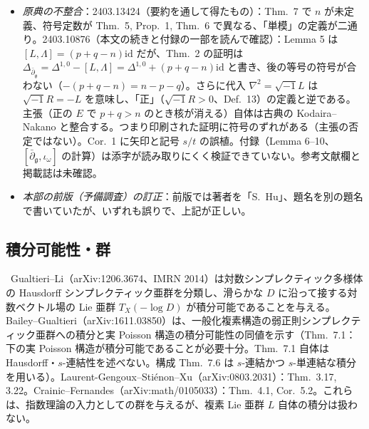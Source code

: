 \begin{itemize}
\item \emph{原典の不整合}：2403.13424（要約を通して得たもの）：Thm.\ 7 で $n$ が未定義、符号定数が Thm.\ 5, Prop.\ 1, Thm.\ 6 で異なる、「単模」の定義が二通り。2403.10876（本文の続きと付録の一部を読んで確認\tC）：Lemma 5 は $[L,\Lambda]=(p+q-n)\mathrm{id}$ だが、Thm.\ 2 の証明は $\Delta_{\bar\partial_{\mathfrak g}}=\Delta^{1,0}-[L,\Lambda]=\Delta^{1,0}+(p+q-n)\mathrm{id}$ と書き、後の等号の符号が合わない（$-(p+q-n)=n-p-q$）。さらに代入 $\nabla^2=\sqrt{-1}L$ は $\sqrt{-1}R=-L$ を意味し、「正」（$\sqrt{-1}R>0$、Def.\ 13）の定義と逆である。主張（正の $E$ で $p+q>n$ のとき核が消える）自体は古典の Kodaira--Nakano と整合する。つまり印刷された証明に符号のずれがある（主張の否定ではない）。Cor.\ 1 に矢印と記号 $s/t$ の誤植。付録（Lemma 6--10、$[\bar\partial_{\mathfrak g},\iota_\omega]$ の計算）は添字が読み取りにくく検証できていない。参考文献欄と掲載誌は未確認。\tQ
\item \emph{本部の前版（予備調査）の訂正}：前版では著者を「S.\ Hu」、題名を別の題名で書いていたが、いずれも誤りで、上記が正しい。
\end{itemize}

\subsection{積分可能性・群}
\tC\ Gualtieri--Li（arXiv:1206.3674、IMRN 2014）は対数シンプレクティック多様体の Hausdorff シンプレクティック亜群を分類し、滑らかな $D$ に沿って接する対数ベクトル場の Lie 亜群 $T_X(-\log D)$ が積分可能であることを与える。Bailey--Gualtieri（arXiv:1611.03850）は、一般化複素構造の弱正則シンプレクティック亜群への積分と実 Poisson 構造の積分可能性の同値を示す（Thm.\ 7.1：下の実 Poisson 構造が積分可能であることが必要十分。Thm.\ 7.1 自体は Hausdorff・$s$-連結性を述べない。構成 Thm.\ 7.6 は $s$-連結かつ $s$-単連結な積分を用いる）。Laurent-Gengoux--Stiénon--Xu（arXiv:0803.2031）：Thm.\ 3.17, 3.22。Crainic--Fernandes（arXiv:math/0105033）：Thm.\ 4.1, Cor.\ 5.2。これらは、指数理論の入力としての群を与えるが、複素 Lie 亜群 $L$ 自体の積分は扱わない。

